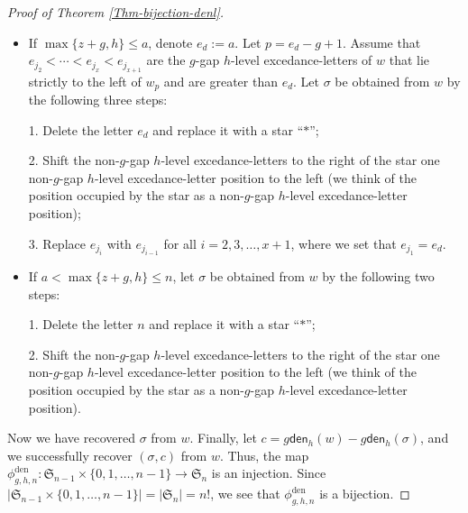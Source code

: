 \documentclass[12pt]{article}
\begin{document}
\begin{proof}[Proof of Theorem \ref{Thm-bijection-denl}]
\begin{itemize}
	\item[$\bullet$] If $\max\{z+g,h\}\leq a$, denote $e_{d}:=a$.
	Let $p=e_{d}-g+1$.
	Assume that $e_{j_{2}}<\cdots<e_{j_{x}}<e_{j_{x+1}}$ are the $g$-gap $h$-level excedance-letters of $w$ that lie strictly to the left of $w_{p}$ and are greater than $e_{d}$.
	Let $\sigma$ be obtained from $w$ by the following three steps:
	
	1. Delete the letter $e_{d}$ and replace it with a star ``$\ast$'';
	
	2. Shift the non-$g$-gap $h$-level excedance-letters to the right of the star one non-$g$-gap $h$-level excedance-letter position to the left (we think of the position occupied by the star as a non-$g$-gap $h$-level excedance-letter position);
	
	3. Replace $e_{j_{i}}$ with $e_{j_{i-1}}$ for all $i=2,3,\ldots,x+1$, where we set that $e_{j_{1}}=e_{d}$.
	
	\item[$\bullet$] If $a<\max\{z+g,h\}\leq n$,
	let $\sigma$ be  obtained from $w$ by the following two steps:
	
	1. Delete the letter $n$ and replace it with a star ``$\ast$'';

	2. Shift the non-$g$-gap $h$-level excedance-letters to the right of the star one non-$g$-gap $h$-level excedance-letter position to the left (we think of the position occupied by the star as a non-$g$-gap $h$-level excedance-letter position).
\end{itemize}
Now we have recovered $\sigma$ from $w$.
Finally, let $c=g\textsf{den}_{h}(w)-g\textsf{den}_{h}(\sigma)$,
and we successfully recover $(\sigma,c)$ from $w$.
Thus, the map $\phi_{g,h,n}^{\text{den}}: \mathfrak{S}_{n-1}\times\{0,1,\ldots,n-1\}\rightarrow\mathfrak{S}_{n}
$
is an injection.
Since $|\mathfrak{S}_{n-1}\times\{0,1,\ldots,n-1\}|=|\mathfrak{S}_{n}|=n!$,
we see that $\phi_{g,h,n}^{\text{den}}$ is a bijection.
\end{proof}
\end{document}
